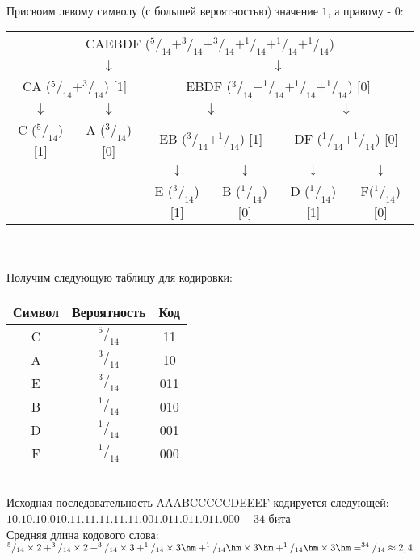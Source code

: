 \\Присвоим левому символу (с большей вероятностью) значение $1$, а правому - $0$:
\begin{table}[h]
\centering
\begin{tabular}{c c c c c c}
\multicolumn{6}{c}{CAEBDF ($^5/_{14} + ^3/_{14} + ^3/_{14} + ^1/_{14} + ^1/_{14} + ^1/_{14}$)} \\
& $\downarrow$ & \multicolumn{4}{c}{$\downarrow$} \\
\multicolumn{2}{c}{CA ($^5/_{14} + ^3/_{14}$) [1]} & \multicolumn{4}{c}{EBDF ($^3/_{14} + ^1/_{14} + ^1/_{14} + ^1/_{14}$) [0]} \\
$\downarrow$ & $\downarrow$ & \multicolumn{2}{c}{$\downarrow$} & \multicolumn{2}{c}{$\downarrow$} \\
C ($^5/_{14}$) [1] & A ($^3/_{14}$) [0] & \multicolumn{2}{c}{EB ($^3/_{14} + ^1/_{14}$) [1]} & \multicolumn{2}{c}{DF ($^1/_{14} + ^1/_{14}$) [0]} \\
 & & $\downarrow$ & $\downarrow$ & $\downarrow$ & $\downarrow$ \\
 & & E ($^3/_{14}$) [1] & B ($^1/_{14}$) [0] & D ($^1/_{14}$) [1] & F($^1/_{14}$) [0] \\
\end{tabular}
\end{table}
\\
\\Получим следующую таблицу для кодировки:
\begin{table}[h]
\begin{tabular}{|c|c|c|}
\hline
Символ & Вероятность & Код \\
\hline
C & $^5/_{14}$ & 11 \\
A & $^3/_{14}$ & 10 \\
E & $^3/_{14}$ & 011 \\
B & $^1/_{14}$ & 010 \\
D & $^1/_{14}$ & 001 \\
F & $^1/_{14}$ & 000 \\
\hline
\end{tabular}
\end{table}
\\Исходная последовательность AAABCCCCCDEEEF кодируется следующей: $10.10.10.010.11.11.11.11.11.001.011.011.011.000 - 34$ бита
\\Средняя длина кодового слова: $^5/_{14}\times 2 + ^3/_{14}\times 2 + ^3/_{14}\times 3 + ^1/_{14}\times 3\hm + ^1/_{14}\hm\times 3\hm + ^1/_{14}\hm\times 3\hm = ^{34}/_{14} \approx 2,4$
